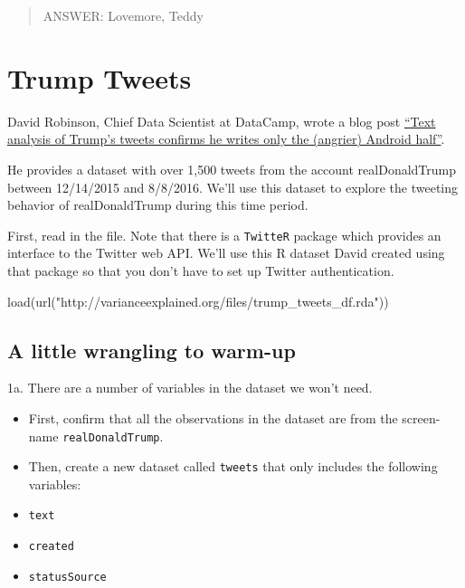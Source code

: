 \documentclass[
]{article}
\newenvironment{Shaded}{\begin{snugshade}}{\end{snugshade}}
\newcommand{\FunctionTok}[1]{\textcolor[rgb]{0.00,0.00,0.00}{#1}}
\newcommand{\NormalTok}[1]{#1}
\newcommand{\StringTok}[1]{\textcolor[rgb]{0.31,0.60,0.02}{#1}}
\begin{document}
\begin{quote}
ANSWER: Lovemore, Teddy
\end{quote}

\newpage

\hypertarget{trump-tweets}{%
\section{Trump Tweets}\label{trump-tweets}}

David Robinson, Chief Data Scientist at DataCamp, wrote a blog post
\href{http://varianceexplained.org/r/trump-tweets/}{``Text analysis of
Trump's tweets confirms he writes only the (angrier) Android half''}.

He provides a dataset with over 1,500 tweets from the account
realDonaldTrump between 12/14/2015 and 8/8/2016. We'll use this dataset
to explore the tweeting behavior of realDonaldTrump during this time
period.

First, read in the file. Note that there is a \texttt{TwitteR} package
which provides an interface to the Twitter web API. We'll use this R
dataset David created using that package so that you don't have to set
up Twitter authentication.

\begin{Shaded}
\begin{Highlighting}[]
\FunctionTok{load}\NormalTok{(}\FunctionTok{url}\NormalTok{(}\StringTok{"http://varianceexplained.org/files/trump\_tweets\_df.rda"}\NormalTok{))}
\end{Highlighting}
\end{Shaded}

\hypertarget{a-little-wrangling-to-warm-up}{%
\subsection{A little wrangling to
warm-up}\label{a-little-wrangling-to-warm-up}}

1a. There are a number of variables in the dataset we won't need.

\begin{itemize}
\item
  First, confirm that all the observations in the dataset are from the
  screen-name \texttt{realDonaldTrump}.
\item
  Then, create a new dataset called \texttt{tweets} that only includes
  the following variables:
\item
  \texttt{text}
\item
  \texttt{created}
\item
  \texttt{statusSource}
\end{itemize}
\end{document}
